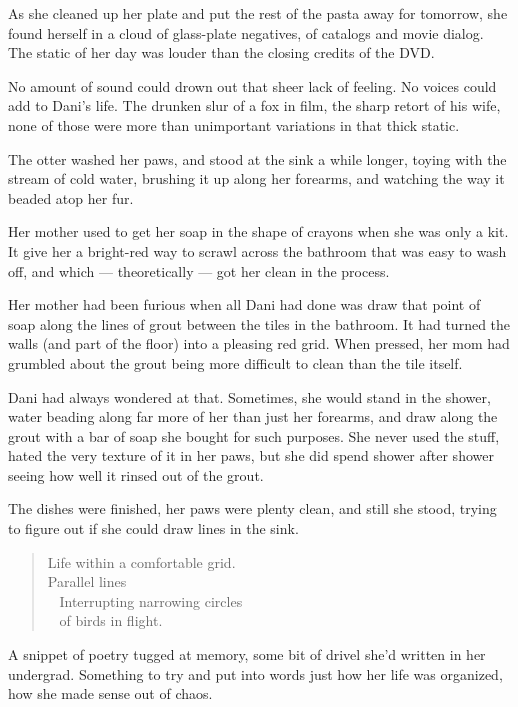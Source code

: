 As she cleaned up her plate and put the rest of the pasta away for tomorrow, she found herself in a cloud of glass-plate negatives, of catalogs and movie dialog. The static of her day was louder than the closing credits of the DVD.

No amount of sound could drown out that sheer lack of feeling. No voices could add to Dani's life. The drunken slur of a fox in film, the sharp retort of his wife, none of those were more than unimportant variations in that thick static.

The otter washed her paws, and stood at the sink a while longer, toying with the stream of cold water, brushing it up along her forearms, and watching the way it beaded atop her fur.

Her mother used to get her soap in the shape of crayons when she was only a kit. It give her a bright-red way to scrawl across the bathroom that was easy to wash off, and which --- theoretically --- got her clean in the process.

Her mother had been furious when all Dani had done was draw that point of soap along the lines of grout between the tiles in the bathroom. It had turned the walls (and part of the floor) into a pleasing red grid. When pressed, her mom had grumbled about the grout being more difficult to clean than the tile itself.

Dani had always wondered at that. Sometimes, she would stand in the shower, water beading along far more of her than just her forearms, and draw along the grout with a bar of soap she bought for such purposes. She never used the stuff, hated the very texture of it in her paws, but she did spend shower after shower seeing how well it rinsed out of the grout.

The dishes were finished, her paws were plenty clean, and still she stood, trying to figure out if she could draw lines in the sink.

\begin{quote}
Life within a comfortable grid.\\
Parallel lines\\
\hspace*{0.333em} ~ Interrupting narrowing circles\\
\hspace*{0.333em} ~ of birds in flight.
\end{quote}

A snippet of poetry tugged at memory, some bit of drivel she'd written in her undergrad. Something to try and put into words just how her life was organized, how she made sense out of chaos.

